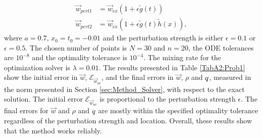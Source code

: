 \begin{align*}
\vec{w}_{pert1} &= \vec{w}_{ex}(1+ \epsilon \tilde g(t))\\
\vec{w}_{pert2} &= \vec{w}_{ex}(1+ \epsilon \tilde g(t) \tilde h(x)),
\end{align*}
where $a = 0.7$, $x_0 = t_0 = -0.01$ and the perturbation strength is either $\epsilon = 0.1$ or $\epsilon = 0.5$.
The chosen number of points is $N =30$ and $n=20$, the ODE tolerances are $10^{-8}$ and the optimality tolerance is $10^{-4}$. The mixing rate for the optimization solver is $\lambda = 0.01$.
The results presented in Table \ref{TabA2:Prob1} show the initial error in $\vec{w}$, $\mathcal{E}_{\vec{w}_{uc}}$, and the final errors in $\vec{w}$, $\rho$ and $q$, measured in the norm presented in Section \ref{sec:Method_Solver}, with respect to the exact solution. The initial error $\mathcal{E}_{\vec{w}_{uc}}$ is proportional to the perturbation strength $\epsilon$. The final errors for $\vec{w}$ and $\rho$ and $q$ are mostly within the specified optimality tolerance regardless of the perturbation strength and location. Overall, these results show that the method works reliably.


